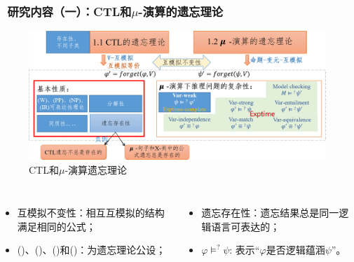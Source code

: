 \documentclass[9pt, CJK]{beamer}
\begin{document}
\begin{frame}  
	\frametitle{~研究内容（一）：CTL和$\mu$-演算的遗忘理论}
	\begin{figure}
		\includegraphics[scale=0.35]{figures/ctlMuForgFrame2}
		\caption{CTL和$\mu$-演算遗忘理论}
	\end{figure}
	{\tiny 
		\begin{columns}
			\begin{itemize} 
				\item 互模拟不变性：相互互模拟的结构满足相同的公式；
				\item (\W)、(\PP)、(\NgP)和(\IR)：为遗忘理论公设；
			\end{itemize}
			\begin{itemize}
				\item 遗忘存在性：遗忘结果总是同一逻辑语言可表达的；
				\item $\varphi \models^? \psi$: 表示“$\varphi$是否逻辑蕴涵$\psi$”。
			\end{itemize}
		\end{columns}
	} 
\end{frame}
\end{document}
